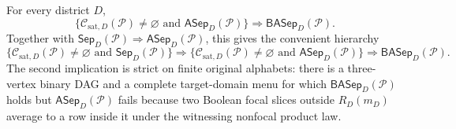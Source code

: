 For every district \(D\),
\[
\bigl\{\mathcal C_{\mathrm{sat},D}(\mathcal P)\ne\varnothing
\text{ and }\mathsf{ASep}_D(\mathcal P)\bigr\}
\Longrightarrow \mathsf{BASep}_D(\mathcal P).
\]
Together with \(\mathsf{Sep}_D(\mathcal P)\Longrightarrow\mathsf{ASep}_D(\mathcal P)\), this gives the convenient hierarchy
\[
\bigl\{\mathcal C_{\mathrm{sat},D}(\mathcal P)\ne\varnothing
\text{ and }\mathsf{Sep}_D(\mathcal P)\bigr\}
\Longrightarrow
\bigl\{\mathcal C_{\mathrm{sat},D}(\mathcal P)\ne\varnothing
\text{ and }\mathsf{ASep}_D(\mathcal P)\bigr\}
\Longrightarrow \mathsf{BASep}_D(\mathcal P).
\]
The second implication is strict on finite original alphabets: there is a three-vertex binary DAG and a complete target-domain menu for which \(\mathsf{BASep}_D(\mathcal P)\) holds but \(\mathsf{ASep}_D(\mathcal P)\) fails because two Boolean focal slices outside \(R_D(m_D)\) average to a row inside it under the witnessing nonfocal product law.